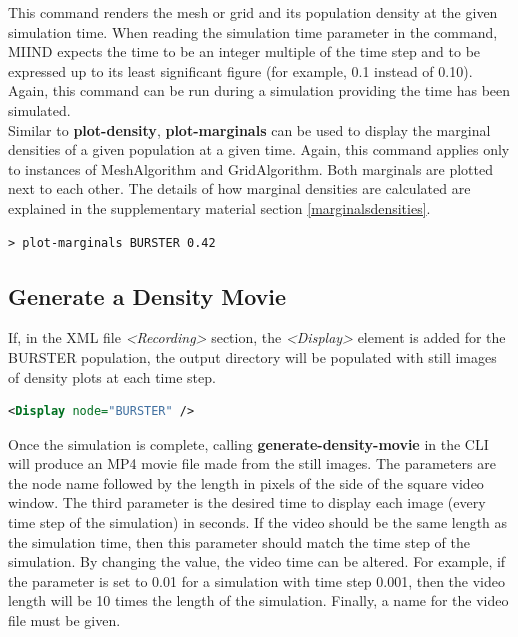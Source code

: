 \documentclass[utf8]{frontiersSCNS} %
\begin{document}
This command renders the mesh or grid and its population density at the given simulation time. When reading the simulation time parameter in the command, MIIND expects the time to be an integer multiple of the time step and to be expressed up to its least significant figure (for example, 0.1 instead of 0.10). Again, this command can be run during a simulation providing the time has been simulated.\\

Similar to \textbf{plot-density}, \textbf{plot-marginals} can be used to display the marginal densities of a given population at a given time. Again, this command applies only to instances of MeshAlgorithm and GridAlgorithm. Both marginals are plotted next to each other. The details of how marginal densities are calculated are explained in the supplementary material section \ref{marginalsdensities}.\\

\begin{lstlisting}[language=xml]
> plot-marginals BURSTER 0.42
\end{lstlisting}

\subsection{Generate a Density Movie}
\label{densitymovie}
If, in the XML file \textit{\textless Recording\textgreater} section, the \textit{\textless Display\textgreater} element is added for the BURSTER population, the output directory will be populated with still images of density plots at each time step.

\begin{lstlisting}[language=xml]
<Display node="BURSTER" />
\end{lstlisting}

Once the simulation is complete, calling \textbf{generate-density-movie} in the CLI will produce an MP4 movie file made from the still images. The parameters are the node name followed by the length in pixels of the side of the square video window. The third parameter is the desired time to display each image (every time step of the simulation) in seconds. If the video should be the same length as the simulation time, then this parameter should match the time step of the simulation. By changing the value, the video time can be altered. For example, if the parameter is set to 0.01 for a simulation with time step 0.001, then the video length will be 10 times the length of the simulation. Finally, a name for the video file must be given.
\end{document}
